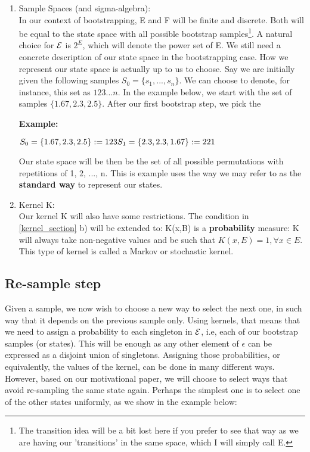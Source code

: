\begin{enumerate}

\item Sample Spaces (and sigma-algebra): \\
In our context of bootstrapping, E and F will be finite and discrete. Both will be equal to the state space with all possible bootstrap samples\footnote{The transition idea will be a bit lost here if you prefer to see that way as we are having our 'transitions' in the same space, which I will simply call E.}. A natural choice for $\mathcal{E}$ is $2^E$, which will denote the power set of E. We still need a concrete description of our state space in the bootstrapping case. How we represent our state space is actually up to us to choose. Say we are initially given the following samples $S_0 = \{s_1, ..., s_n\}$. We can choose to denote, for instance, this set as $123...n$. In the example below, we start with the set of samples $\{1.67, 2.3, 2.5\}$. After our first bootstrap step, we pick the 

\textbf{Example:}

$
S_0 = \{1.67, 2.3, 2.5\} := 123 \\
S_1 = \{2.3, 2.3, 1.67\} := 221
$

Our state space will be then be the set of all possible permutations with repetitions of 1, 2, ..., n. This is example uses the way we may refer to as the \textbf{standard way} to represent our states.

\item Kernel K: \\ 
Our kernel K will also have some restrictions. The condition in \ref{kernel_section} b) will be extended to:  K(x,B) is a \textbf{probability} measure: K will always take non-negative values and be such that $K(x,E) = 1, \forall x \in E.$ This type of kernel is called a Markov or stochastic kernel.

\end{enumerate}



\subsection{Re-sample step}

Given a sample, we now wish to choose a new way to select the next one, in such way that it depends on the previous sample only. Using kernels, that means that we need to assign a probability to each singleton in $\mathcal{E}$, i.e, each of our bootstrap samples (or states). This will be enough as any other element of $\epsilon$ can be expressed as a disjoint union of singletons. Assigning those probabilities, or equivalently, the values of the kernel, can be done in many different ways. However, based on our motivational paper, we will choose to select ways that avoid re-sampling the same state again. Perhaps the simplest one is to select one of the other states uniformly, as we show in the example below:

